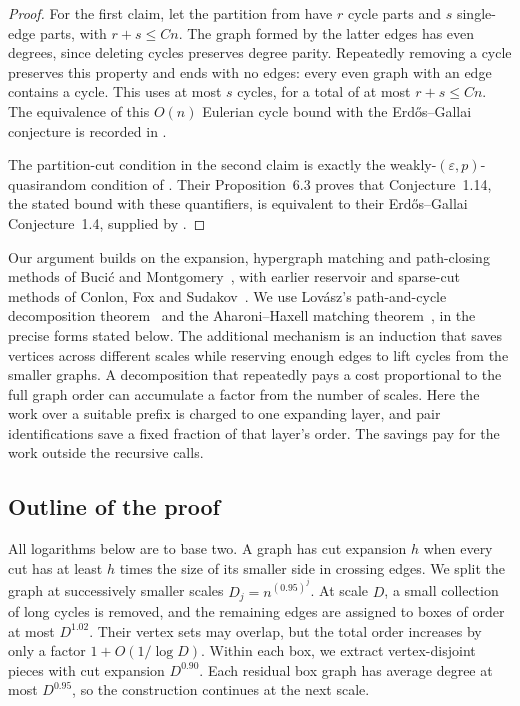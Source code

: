 \documentclass[11pt]{article}
\numberwithin{equation}{section}
\theoremstyle{definition}
\theoremstyle{remark}
\newcommand{\eps}{\varepsilon}
\begin{document}
\begin{proof}
For the first claim, let the partition from  have \(r\)
cycle parts and \(s\) single-edge parts, with \(r+s\le Cn\). The graph
formed by the latter edges has even degrees, since deleting cycles
preserves degree parity. Repeatedly removing a cycle preserves this
property and ends with no edges: every even graph with an edge contains
a cycle. This uses at most \(s\) cycles, for a total of at most
\(r+s\le Cn\). The equivalence of this \(O(n)\) Eulerian cycle bound
with the Erd\H{o}s--Gallai conjecture is recorded in
\cite[Section~1.1]{GGKO2021}.

The partition-cut condition in the second claim is exactly the
weakly-\((\eps,p)\)-quasirandom condition of
\cite[Section~1.2]{GGKO2021}. Their Proposition~6.3 proves that
Conjecture~1.14, the stated bound with these quantifiers, is equivalent
to their Erd\H{o}s--Gallai Conjecture~1.4, supplied by .
\end{proof}

Our argument builds on the expansion, hypergraph matching and
path-closing methods of Buci\'c and Montgomery~\cite{BM2024}, with
earlier reservoir and sparse-cut methods of Conlon, Fox and
Sudakov~\cite{CFS2014}.
We use Lov\'asz's path-and-cycle decomposition
theorem~\cite{Lovasz1968} and the Aharoni--Haxell matching
theorem~\cite{AH2000}, in the precise forms stated below.
The additional mechanism is an induction that saves vertices
across different scales while reserving enough edges to lift
cycles from the smaller graphs. A decomposition that repeatedly pays
a cost proportional to the full graph order can accumulate a factor
from the number of scales. Here the work over a suitable prefix is
charged to one expanding layer, and pair identifications save a fixed
fraction of that layer's order. The savings pay for the work outside
the recursive calls.

\subsection*{Outline of the proof}

All logarithms below are to base two. A graph has cut expansion
\(h\) when every cut has at least \(h\) times the size of its
smaller side in crossing edges.
We split the graph at successively smaller scales
\(D_j=n^{(0.95)^j}\). At scale \(D\), a small collection of long cycles
is removed, and the remaining edges are assigned to boxes of order at
most \(D^{1.02}\). Their vertex sets may overlap, but the total order
increases by only a factor \(1+O(1/\log D)\). Within each box, we
extract vertex-disjoint pieces with cut expansion \(D^{0.90}\).
Each residual box graph has average degree at most \(D^{0.95}\), so
the construction continues at the next scale.
\end{document}
